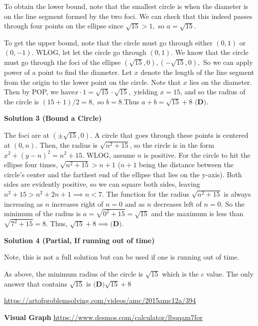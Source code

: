 \begin{enumerate}
 To obtain the lower bound, note that the smallest circle is when the diameter is on the line segment formed by the two foci. We can check that this indeed passes through four points on the ellipse since $\sqrt{15}>1,$ so $a=\sqrt{15}.$

 To get the upper bound, note that the circle must go through either $(0,1)$ or $(0,-1).$ WLOG, let let the circle go through $(0,1).$ We know that the circle must go through the foci of the ellipse $(\sqrt{15},0), (-\sqrt{15},0),$ So we can apply power of a point to find the diameter. Let $x$ denote the length of the line segment from the origin to the lower point on the circle. Note that $x$ lies on the diameter. Then by POP, we have$x \cdot 1 = \sqrt{15} \cdot \sqrt{15},$ yielding $x=15$, and so the radius of the circle is $(15+1)/2=8,$ so $b=8.$Thus $a+b=\sqrt{15}+8 \textbf{ (D)}$. 

 



\textbf{Solution 3 (Bound a Circle)}

The foci are at $(\pm\sqrt{15}, 0)$. A circle that goes through these points is centered at $(0,n)$. Then, the radius is $\sqrt{n^2+15}$, so the circle is in the form $x^2+(y-n)^2=n^2+15$. WLOG, assume $n$ is positive. For the circle to hit the ellipse four times, $\sqrt{n^2+15}>n+1$ ($n+1$ being the distance between the circle's center and the farthest end of the ellipse that lies on the y-axis). Both sides are evidently positive, so we can square both sides, leaving $n^2+15>n^2+2n+1 \implies n<7$. The function for the radius $\sqrt{n^2+15}$ is always increasing as $n$ increases right of $n=0$ and as $n$ decreases left of $n=0$. So the minimum of the radius is $a=\sqrt{0^2+15}=\sqrt{15}$ and the maximum is less than $\sqrt{7^2+15}=8$. Thus, $\sqrt{15}+8 \implies \textbf{(D)}$.

 



\textbf{Solution 4 (Partial, If running out of time)}

Note, this is not a full solution but can be used if one is running out of time.

 As above, the minimum radius of the circle is $\sqrt{15}$ which is the $c$ value. The only answer that contains $\sqrt{15}$ is $\boxed{\textbf{(D)} \sqrt{15}+8}$

 \href{https://artofproblemsolving.com/videos/amc/2015amc12a/394}{https://artofproblemsolving.com/videos/amc/2015amc12a/394}

 \textbf{Visual Graph} \href{https://www.desmos.com/calculator/lbqqam7for}{https://www.desmos.com/calculator/lbqqam7for}


\end{enumerate}
